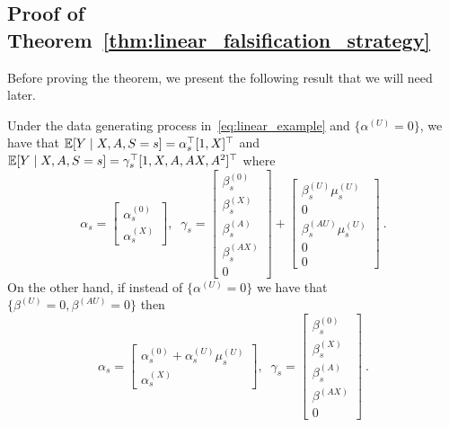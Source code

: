 \documentclass{article}
\begin{document}
 
\subsection{Proof of Theorem~\ref*{thm:linear_falsification_strategy}}\label{app:thm:linear_falsification_strategy}
Before proving the theorem, we present the following result that we will need later.
\begin{lemma}\label{lem:special_cases}
    Under the data generating process in~\eqref{eq:linear_example} and $\{\alpha^{(U)} = 0\}$, we have that $\mathbb{E}[Y\mid X, A, S=s]=\alpha_s^\top[1,X]^\top$ and $\mathbb{E}[Y\mid X, A, S=s] = \gamma_s^\top[1,X,A,AX,A^2]^\top$ where 
    \begin{equation*}
        \alpha_s = 
        \begin{bmatrix}
            \alpha_{s}^{(0)} \\
            \alpha_{s}^{(X)}
        \end{bmatrix},\;\;
        \gamma_s = 
        \begin{bmatrix}
            \beta_{s}^{(0)} \\
            \beta_{s}^{(X)} \\
            \beta_{s}^{(A)} \\
            \beta_{s}^{(AX)} \\
            0
        \end{bmatrix}
        +
        \begin{bmatrix}
            \beta_{s}^{(U)}\mu_s^{(U)}\\
            0 \\
            \beta_{s}^{(AU)}\mu_{s}^{(U)}\\
            0 \\
            0
        \end{bmatrix}~.
    \end{equation*}
    On the other hand, if instead of $\{\alpha^{(U)} = 0\}$ we have that $\{\beta^{(U)}=0, \beta^{(AU)}=0\}$ then 
    \begin{equation*}
        \alpha_s = 
        \begin{bmatrix}
            \alpha_{s}^{(0)}  + \alpha_{s}^{(U)} \mu_{s}^{(U)}\\
            \alpha_{s}^{(X)}
        \end{bmatrix},\;\;
        \gamma_s = 
        \begin{bmatrix}
            \beta_{s}^{(0)} \\
            \beta_{s}^{(X)} \\
            \beta_{s}^{(A)} \\
            \beta^{(AX)} \\
            0
        \end{bmatrix}~.
    \end{equation*}
\end{lemma}
\end{document}
